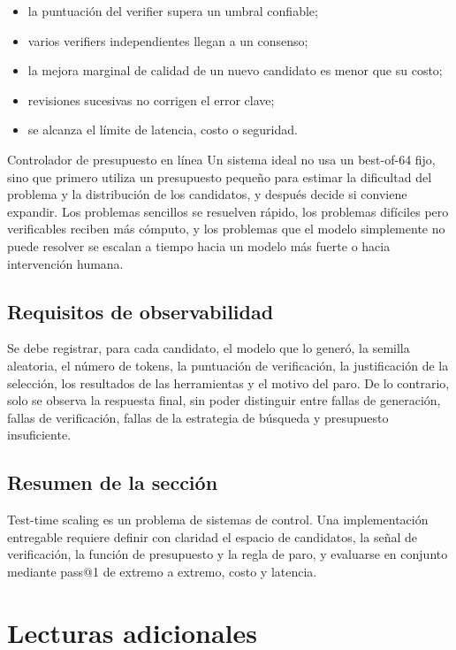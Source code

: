 \documentclass[a4paper]{article}
\begin{document}
\begin{itemize}
    \item la puntuación del verifier supera un umbral confiable;
    \item varios verifiers independientes llegan a un consenso;
    \item la mejora marginal de calidad de un nuevo candidato es menor que su costo;
    \item revisiones sucesivas no corrigen el error clave;
    \item se alcanza el límite de latencia, costo o seguridad.
\end{itemize}

\begin{importantbox}{Controlador de presupuesto en línea}
Un sistema ideal no usa un best-of-64 fijo, sino que primero utiliza un presupuesto pequeño para estimar la dificultad del problema y la distribución de los candidatos, y después decide si conviene expandir. Los problemas sencillos se resuelven rápido, los problemas difíciles pero verificables reciben más cómputo, y los problemas que el modelo simplemente no puede resolver se escalan a tiempo hacia un modelo más fuerte o hacia intervención humana.
\end{importantbox}

\subsection{Requisitos de observabilidad}

Se debe registrar, para cada candidato, el modelo que lo generó, la semilla aleatoria, el número de tokens, la puntuación de verificación, la justificación de la selección, los resultados de las herramientas y el motivo del paro. De lo contrario, solo se observa la respuesta final, sin poder distinguir entre fallas de generación, fallas de verificación, fallas de la estrategia de búsqueda y presupuesto insuficiente.

\subsection{Resumen de la sección}

Test-time scaling es un problema de sistemas de control. Una implementación entregable requiere definir con claridad el espacio de candidatos, la señal de verificación, la función de presupuesto y la regla de paro, y evaluarse en conjunto mediante pass@1 de extremo a extremo, costo y latencia.
\section{Lecturas adicionales}
\end{document}
